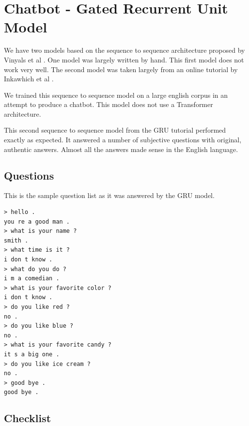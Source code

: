 \section{Chatbot - Gated Recurrent Unit Model}
We have two models based on the sequence to sequence architecture proposed by Vinyals et al \cite{DBLP:journals/corr/VinyalsL15}. One model was largely written by hand. This first model does not work very well. The second model was taken largely from an online tutorial by  Inkawhich et al \cite{2018Inkawhich}.

We trained this sequence to sequence model on a large english corpus in an attempt to produce a chatbot. This model does not use a Transformer architecture.

This second sequence to sequence model from the GRU tutorial performed exactly as expected. It answered a number of subjective questions with original, authentic answers. Almost all the answers made sense in the English language.

\subsection{Questions}
This is the sample question list as it was answered by the GRU model.

\begin{verbatim}
> hello .
you re a good man .
> what is your name ?
smith .
> what time is it ?
i don t know .
> what do you do ?
i m a comedian .
> what is your favorite color ?
i don t know .
> do you like red ?
no .
> do you like blue ?
no .
> what is your favorite candy ?
it s a big one .
> do you like ice cream ?
no .
> good bye .
good bye .
\end{verbatim}


\subsection{Checklist}

